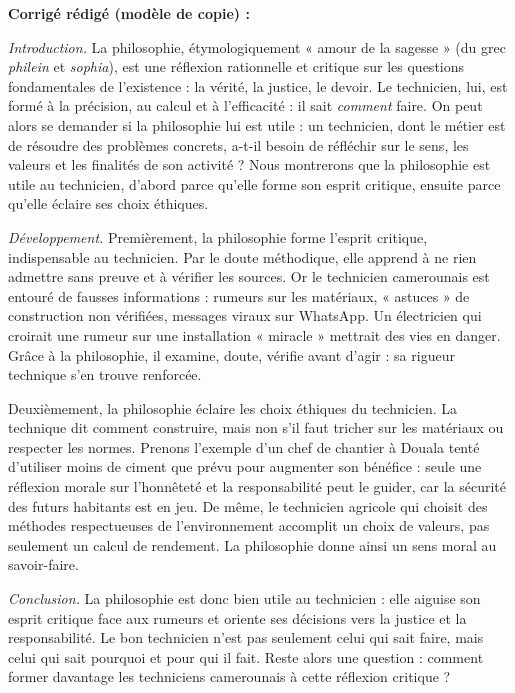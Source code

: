 \documentclass[11pt]{article}
\begin{document}
\begin{corrige}
\textbf{Corrigé rédigé (modèle de copie) :}

\emph{Introduction.} La philosophie, étymologiquement « amour de la sagesse » (du grec \emph{philein} et \emph{sophia}), est une réflexion rationnelle et critique sur les questions fondamentales de l'existence : la vérité, la justice, le devoir. Le technicien, lui, est formé à la précision, au calcul et à l'efficacité : il sait \emph{comment} faire. On peut alors se demander si la philosophie lui est utile : un technicien, dont le métier est de résoudre des problèmes concrets, a-t-il besoin de réfléchir sur le sens, les valeurs et les finalités de son activité ? Nous montrerons que la philosophie est utile au technicien, d'abord parce qu'elle forme son esprit critique, ensuite parce qu'elle éclaire ses choix éthiques.

\emph{Développement.} Premièrement, la philosophie forme l'esprit critique, indispensable au technicien. Par le doute méthodique, elle apprend à ne rien admettre sans preuve et à vérifier les sources. Or le technicien camerounais est entouré de fausses informations : rumeurs sur les matériaux, « astuces » de construction non vérifiées, messages viraux sur WhatsApp. Un électricien qui croirait une rumeur sur une installation « miracle » mettrait des vies en danger. Grâce à la philosophie, il examine, doute, vérifie avant d'agir : sa rigueur technique s'en trouve renforcée.

Deuxièmement, la philosophie éclaire les choix éthiques du technicien. La technique dit comment construire, mais non s'il faut tricher sur les matériaux ou respecter les normes. Prenons l'exemple d'un chef de chantier à Douala tenté d'utiliser moins de ciment que prévu pour augmenter son bénéfice : seule une réflexion morale sur l'honnêteté et la responsabilité peut le guider, car la sécurité des futurs habitants est en jeu. De même, le technicien agricole qui choisit des méthodes respectueuses de l'environnement accomplit un choix de valeurs, pas seulement un calcul de rendement. La philosophie donne ainsi un sens moral au savoir-faire.

\emph{Conclusion.} La philosophie est donc bien utile au technicien : elle aiguise son esprit critique face aux rumeurs et oriente ses décisions vers la justice et la responsabilité. Le bon technicien n'est pas seulement celui qui sait faire, mais celui qui sait pourquoi et pour qui il fait. Reste alors une question : comment former davantage les techniciens camerounais à cette réflexion critique ?


\end{corrige}
\end{document}
